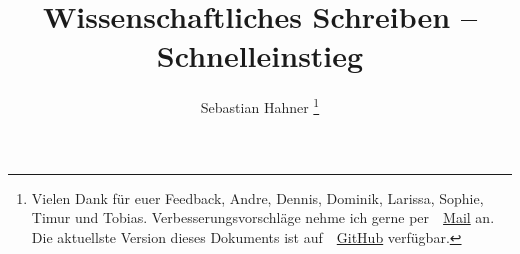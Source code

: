 \documentclass[10pt,journal,compsoc]{IEEEtran}
\begin{document}
\title{Wissenschaftliches Schreiben -- Schnelleinstieg}

\author{Sebastian Hahner
\thanks{Vielen Dank für euer Feedback, Andre, Dennis, Dominik, Larissa, Sophie, Timur und Tobias. 
Verbesserungsvorschläge nehme ich gerne per \,\faEnvelope\ \href{mailto:hahner@kit.edu}{Mail} an. 
Die aktuellste Version dieses Dokuments ist auf \,\faGithub\ \href{https://github.com/sebinside}{GitHub} verfügbar.}}


\maketitle



\printbibliography
\end{document}
